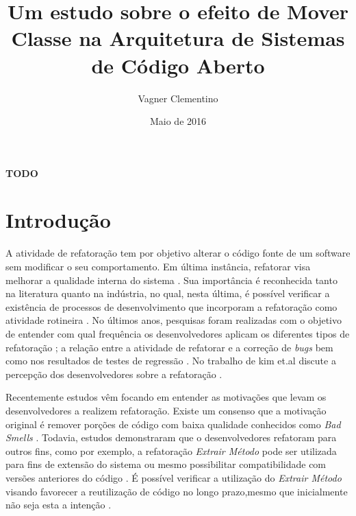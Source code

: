 \documentclass[12pt]{article}
\title{Um estudo sobre o efeito de Mover Classe na Arquitetura de Sistemas de Código Aberto}
\author{Vagner Clementino\inst{1}}
\date{Maio de 2016}
\begin{document}
\maketitle


\begin{resumo}
 \textbf{TODO}
\end{resumo}


\section{Introdução}
\label{sec:intro}

A atividade de refatoração tem por objetivo alterar o código fonte de um software sem modificar o seu comportamento. Em última instância, refatorar visa melhorar a qualidade interna do sistema \cite{Fowler1999,Opdyke:1992:ROF:169783}. Sua importância é reconhecida tanto na literatura quanto na indústria, no qual, nesta última, é possível verificar a existência de processos de desenvolvimento que incorporam a refatoração como atividade rotineira \cite{Beck:2000:PEP:557458}. No últimos anos, pesquisas foram realizadas com o objetivo de entender com qual frequência os desenvolvedores aplicam os diferentes tipos de refatoração \cite{Murphy-Hill:2009:WRW:1555001.1555044}; a relação entre a atividade de refatorar e a correção de \textit{bugs}\cite{Kim:2011:EIR:1985793.1985815} bem como nos resultados de testes de regressão  \cite{Kim:2012:EII:2473496.2473590}. No trabalho de kim et.al discute a percepção dos desenvolvedores sobre a refatoração \cite{Kim:2012:FSR:2393596.2393655}.

Recentemente estudos vêm focando em entender as motivações que levam os desenvolvedores a realizem refatoração. Existe um consenso que a motivação original é remover porções de código com baixa qualidade conhecidos como \textit{Bad Smells} \cite{Fowler1999}. Todavia, estudos demonstraram que o desenvolvedores refatoram para outros fins, como por exemplo, a refatoração \textit{Extrair Método}  pode ser utilizada para fins de extensão do sistema ou mesmo possibilitar compatibilidade com versões anteriores do código \cite{Tsantalis2013}. É possível verificar a utilização do \textit{Extrair Método} visando favorecer a reutilização de código no longo prazo,mesmo que inicialmente não seja esta a intenção \cite{Danilo}.
\end{document}
